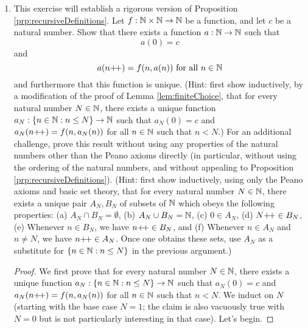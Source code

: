 \documentclass[../main.tex]{subfiles}
\begin{document}
\begin{enumerate}[ref={\thesection.\arabic*}]
    \item \label{exr:3.5.12}This exercise will establish a rigorous version of Proposition \ref{prp:recursiveDefinitions}. Let $f:\mathbb{N}\times\mathbb{N}\to\mathbb{N}$ be a function, and let $c$ be a natural number. Show that there exists a function $a:\mathbb{N}\to\mathbb{N}$ such that
    \begin{equation*}
        a(0) = c
    \end{equation*}
    and
    \begin{equation*}
        a(n{+\!+}) = f(n,a(n))\text{ for all }n\in\mathbb{N}
    \end{equation*}
    and furthermore that this function is unique. (Hint: first show inductively, by a modification of the proof of Lemma \ref{lem:finiteChoice}, that for every natural number $N\in\mathbb{N}$, there exists a unique function $a_N:\{n\in\mathbb{N}:n\leq N\}\to\mathbb{N}$ such that $a_N(0)=c$ and $a_N(n{+\!+})=f(n,a_N(n))$ for all $n\in\mathbb{N}$ such that $n<N$.) For an additional challenge, prove this result without using any properties of the natural numbers other than the Peano axioms directly (in particular, without using the ordering of the natural numbers, and without appealing to Proposition \ref{prp:recursiveDefinitions}). (Hint: first show inductively, using only the Peano axioms and basic set theory, that for every natural number $N\in\mathbb{N}$, there exists a unique pair $A_N,B_N$ of subsets of $\mathbb{N}$ which obeys the following properties: (a) $A_N\cap B_N=\emptyset$, (b) $A_N\cup B_N=\mathbb{N}$, (c) $0\in A_N$, (d) $N{+\!+}\in B_N$, (e) Whenever $n\in B_N$, we have $n{+\!+}\in B_N$, and (f) Whenever $n\in A_N$ and $n\neq N$, we have $n{+\!+}\in A_N$. Once one obtains these sets, use $A_N$ as a substitute for $\{n\in\mathbb{N}:n\leq N\}$ in the previous argument.)
    \begin{proof}
        We first prove that for every natural number $N\in\mathbb{N}$, there exists a unique function $a_N:\{n\in\mathbb{N}:n\leq N\}\to\mathbb{N}$ such that $a_N(0)=c$ and $a_N(n{+\!+})=f(n,a_N(n))$ for all $n\in\mathbb{N}$ such that $n<N$. We induct on $N$ (starting with the base case $N=1$; the claim is also vacuously true with $N=0$ but is not particularly interesting in that case). Let's begin.\par

\end{proof}
\end{enumerate}
\end{document}
